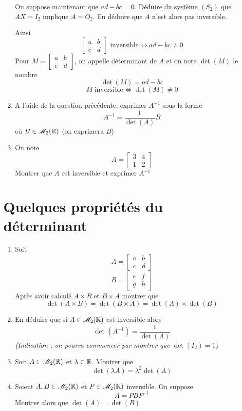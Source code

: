\begin{enumerate}
On suppose maintenant que $ad - bc = 0$. Déduire du système $(S_2)$ que $AX = I_2$ implique $A = O_2$. En déduire que $A$ n'est alors pas inversible.\newline

Ainsi 
$$\boxed{\begin{bmatrix} a & b \\ c & d\end{bmatrix} \text{ inversible} \Leftrightarrow ad-bc \neq 0}$$
Pour $M = \begin{bmatrix} a & b \\ c & d\end{bmatrix}$, on appelle déterminant de $A$ et on note $\det(M)$ le nombre 
$$\det(M) = ad - bc$$
$$\boxed{M \text{ inversible} \Leftrightarrow \det(M) \neq 0}$$
\item A l'aide de la question précédente, exprimer $A^{-1}$ sous la forme 
$$A^{-1} = \frac{1}{\det(A)} B$$
où $B \in \mathscr{M}_2(\mathbb{R})$ (on exprimera $B$)
\item On note 
$$A = \begin{bmatrix} 3 & 4\\ 1 & 2\end{bmatrix}$$
Montrer que $A$ est inversible et exprimer $A^{-1}$
\end{enumerate}
\section{Quelques propriétés du déterminant}
\begin{enumerate}
\item Soit 
$$A = \begin{bmatrix} a & b \\ c & d\end{bmatrix}$$
$$B = \begin{bmatrix} e & f \\ g & h\end{bmatrix}$$
Après avoir calculé $A\times B$ et $B\times A$ montrer que $$\det(A\times B) = \det(B \times A) = \det(A)\times\det(B)$$
\item En déduire que si $A\in\mathscr{M}_2(\mathbb{R})$ est inversible alors 
$$\det(A^{-1}) = \frac{1}{\det(A)}$$
\emph{(Indication : on pourra commencer par montrer que $\det(I_2) = 1$)}
\item Soit $A\in\mathscr{M}_2(\mathbb{R})$ et $\lambda \in \mathbb{R}$. Montrer que 
$$\det(\lambda A) = \lambda^2 \det(A)$$
\item Soient $A,B \in \mathscr{M}_2(\mathbb{R})$ et $P\in\mathscr{M}_2(\mathbb{R})$ inversible. On suppose 
$$A = PBP^{-1}$$
Montrer alors que $\det(A) = \det(B)$
\end{enumerate}
